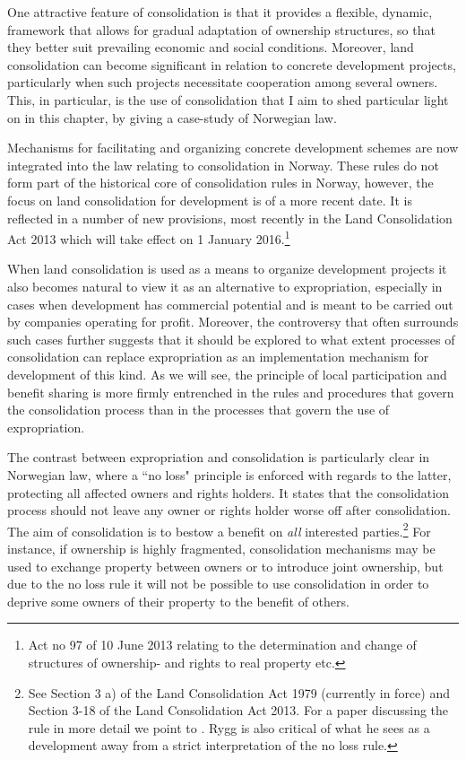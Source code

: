 {One attractive feature of consolidation is that it provides a flexible, dynamic, framework that allows for gradual adaptation of ownership structures, so that they better suit prevailing economic and social conditions. Moreover, land consolidation can become significant in relation to concrete development projects, particularly when such projects necessitate cooperation among several owners. This, in particular, is the use of consolidation that I aim to shed particular light on in this chapter, by giving a case-study of Norwegian law.

Mechanisms for facilitating and organizing concrete development schemes are now integrated into the law relating to consolidation in Norway. These rules do not form part of the historical core of consolidation rules in Norway, however, the focus on land consolidation for development is of a more recent date. It is reflected in a number of new provisions, most recently in the Land Consolidation Act 2013 which will take effect on 1 January 2016.\footnote{Act no 97 of 10 June 2013 relating to the determination and change of structures of ownership- and rights to real property etc.}

When land consolidation is used as a means to organize development projects it also becomes natural to view it as an alternative to expropriation, especially in cases when development has commercial potential and is meant to be carried out by companies operating for profit. Moreover, the controversy that often surrounds such cases further suggests that it should be explored to what extent processes of consolidation can replace expropriation as an implementation mechanism for development of this kind. As we will see, the principle of local participation and benefit sharing is more firmly entrenched in the rules and procedures that govern the consolidation process than in the processes that govern the use of expropriation. 

The contrast between expropriation and consolidation is particularly clear in Norwegian law, where a ``no loss" principle is enforced with regards to the latter, protecting all affected owners and rights holders. It states that the consolidation process should not leave any owner or rights holder worse off after consolidation. The aim of consolidation is to bestow a benefit on \emph{all} interested parties.\footnote{See Section 3 a) of the Land Consolidation Act 1979 (currently in force) and Section 3-18 of the Land Consolidation Act 2013. For a paper discussing the rule in more detail we point to \cite{rygg1998}. Rygg is also critical of what he sees as a development away from a strict interpretation of the no loss rule.} For instance, if ownership is highly fragmented, consolidation mechanisms may be used to exchange property between owners or to introduce joint ownership, but due to the no loss rule it will not be possible to use consolidation in order to deprive some owners of their property to the benefit of others.

}
